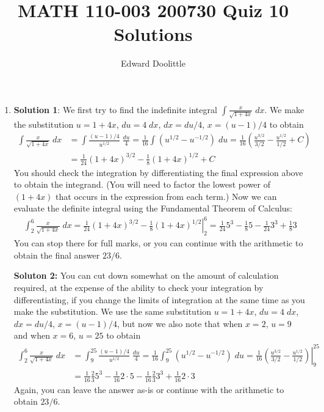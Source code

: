 \documentclass[12pt]{article}
\title{MATH 110-003 200730 Quiz 10 Solutions}
\author{Edward Doolittle}
\newcommand{\ds}{\displaystyle}
\begin{document}
\maketitle

\begin{enumerate}
\item \textbf{Solution 1}: 
  We first try to find the indefinite integral
  $\ds \int \frac{x}{\sqrt{1+4x}} \; dx$.  We make the substitution
  $u=1+4x$, $du = 4\; dx$, $dx = du/4$, $x=(u-1)/4$ to obtain
  \begin{align*}
    \int \frac{x}{\sqrt{1+4x}} \; dx
    &= \int \frac{(u-1)/4}{u^{1/2}} \; \frac{du}{4}
    = \frac{1}{16} \int (u^{1/2} - u^{-1/2}) \; du
    = \frac{1}{16} \left(\frac{u^{3/2}}{3/2} - \frac{u^{1/2}}{1/2} +C\right)
    \\
    &= \frac{1}{24} (1+4x)^{3/2} - \frac{1}{8}(1+4x)^{1/2} + C
  \end{align*}
  You should check the integration by differentiating the final expression
  above to obtain the integrand.  (You will need to factor the lowest power
  of $(1+4x)$ that occurs in the expression from each term.)  Now we
  can evaluate the definite integral using the Fundamental Theorem of Calculus:
  \begin{align*}
    \int_2^6 \frac{x}{\sqrt{1+4x}} \; dx
    = \left. \frac{1}{24} (1+4x)^{3/2} - \frac{1}{8}(1+4x)^{1/2} \right|_2^6
    = \frac{1}{24} 5^3 - \frac{1}{8} 5 - \frac{1}{24} 3^3 + \frac{1}{8} 3
  \end{align*}
  You can stop there for full marks, or you can continue with the arithmetic
  to obtain the final answer $23/6$.

  \textbf{Soluton 2:} You can cut down somewhat on the amount of calculation
  required, at the expense of the ability to check your integration by 
  differentiating, if you change the limits of integration at the same time
  as you make the substitution.  We use the same substitution
  $u=1+4x$, $du = 4\; dx$, $dx = du/4$, $x=(u-1)/4$, but now we also note
  that when $x=2$, $u=9$ and when $x=6$, $u=25$ to obtain
  \begin{align*}
    \int_2^6 \frac{x}{\sqrt{1+4x}} \; dx
    &= \int_9^{25} \frac{(u-1)/4}{u^{1/2}} \; \frac{du}{4}
    = \frac{1}{16} \int_9^{25} (u^{1/2}-u^{-1/2}) \; du
    = \frac{1}{16} \left. 
      \left( \frac{u^{3/2}}{3/2} - \frac{u^{1/2}}{1/2} \right)
    \right|_9^{25}
    \\
    &= \frac{1}{16} \frac{2}{3} 5^3 - \frac{1}{16} 2\cdot 5
    - \frac{1}{16} \frac{2}{3} 3^3 + \frac{1}{16} 2 \cdot 3
  \end{align*}
  Again, you can leave the answer as-is or continue with the arithmetic
  to obtain $23/6$.


\end{enumerate}
\end{document}
